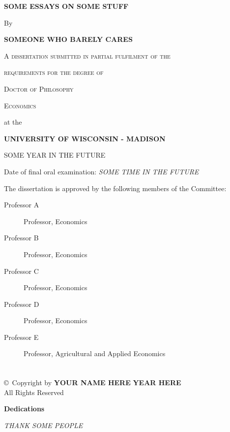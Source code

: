 \documentclass[12pt]{article}
\def\copyrightpage{
  \newpage
  \thispagestyle{empty}    %
  \addtocounter{page}{-1}
  \part*{}            %
  \begin{center}
   \vfill
   \copyright\ Copyright by \textbf{YOUR NAME HERE} \textbf{YEAR HERE}\\
   All Rights Reserved
  \end{center}}
\begin{document}
\begin{titlepage}
\begin{center}
\textbf{\Large SOME ESSAYS ON SOME STUFF}

\vspace{0.8cm}
By

\textbf{SOMEONE WHO BARELY CARES}

\vspace{3cm}

\textsc{A dissertation submitted in partial fulfilment of the}

\textsc{requirements for the degree of}

\vspace{2cm}

\textsc{Doctor of Philosophy}

\textsc{Economics}

\vspace{1cm}

at the 

\textbf{UNIVERSITY OF WISCONSIN - MADISON}

SOME YEAR IN THE FUTURE

\vspace{2cm}
\begin{flushleft}
Date of final oral examination: \emph{SOME TIME IN THE FUTURE}
\end{flushleft}

\begin{flushleft}
The dissertation is approved by the following members of the Committee:
\end{flushleft}

\begin{description}
\item [Professor A] Professor, Economics
\item [Professor B] Professor, Economics
\item [Professor C] Professor, Economics
\item [Professor D] Professor, Economics
\item [Professor E] Professor, Agricultural and Applied Economics
\end{description}

\end{center}
\end{titlepage}

\copyrightpage


\begin{dedication}
\large{\textbf{Dedications}}

\doublespacing
\emph{THANK SOME PEOPLE}

\end{dedication}
\clearpage
\end{document}
